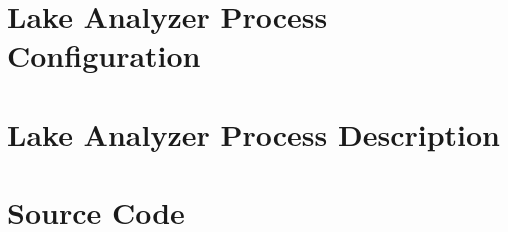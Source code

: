
\chapter{Lake Analyzer Process Configuration}
\label{appendix:lakeanalyzer:configuration}


\chapter{Lake Analyzer Process Description}



\chapter{Source Code}


